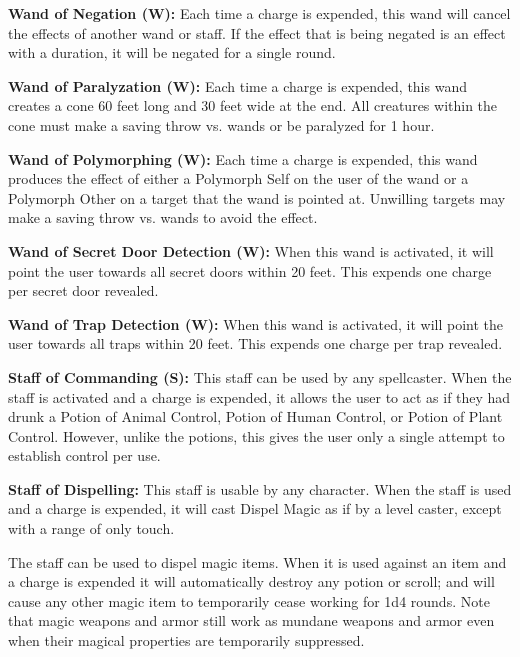 \begin{multicols*}{2}
\textbf{Wand of Negation (W):} Each time a charge is expended, this wand will cancel the effects of another wand or staff. If the effect that is being negated is an effect with a duration, it will be negated for a single round.

\textbf{Wand of Paralyzation (W):} Each time a charge is expended, this wand creates a cone 60 feet long and 30 feet wide at the end. All creatures within the cone must make a saving throw vs. wands or be paralyzed for 1 hour.

\textbf{Wand of Polymorphing (W):} Each time a charge is expended, this wand produces the effect of either a Polymorph Self on the user of the wand or a Polymorph Other on a target that the wand is pointed at. Unwilling targets may make a saving throw vs. wands to avoid the effect.

\textbf{Wand of Secret Door Detection (W):} When this wand is activated, it will point the user towards all secret doors within 20 feet. This expends one charge per secret door revealed.

\textbf{Wand of Trap Detection (W):} When this wand is activated, it will point the user towards all traps within 20 feet. This expends one charge per trap revealed.

\textbf{Staff of Commanding (S):} This staff can be used by any spellcaster. When the staff is activated and a charge is expended, it allows the user to act as if they had drunk a Potion of Animal Control, Potion of Human Control, or Potion of Plant Control. However, unlike the potions, this gives the user only a single attempt to establish control per use.

\textbf{Staff of Dispelling:} This staff is usable by any character. When the staff is used and a charge is expended, it will cast Dispel Magic as if by a  level caster, except with a range of only touch.

The staff can be used to dispel magic items. When it is used against an item and a charge is expended it will automatically destroy any potion or scroll; and will cause any other magic item to temporarily cease working for 1d4 rounds. Note that magic weapons and armor still work as mundane weapons and armor even when their magical properties are temporarily suppressed.


\end{multicols*}
